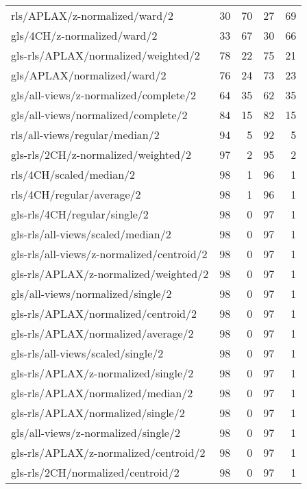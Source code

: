 \begin{longtable}{lrrrr}
    rls/APLAX/z-normalized/ward/2             & 30 & 70 & 27 & 69 \\
    gls/4CH/z-normalized/ward/2               & 33 & 67 & 30 & 66 \\
    gls-rls/APLAX/normalized/weighted/2       & 78 & 22 & 75 & 21 \\
    gls/APLAX/normalized/ward/2               & 76 & 24 & 73 & 23 \\
    gls/all-views/z-normalized/complete/2     & 64 & 35 & 62 & 35 \\
    gls/all-views/normalized/complete/2       & 84 & 15 & 82 & 15 \\
    rls/all-views/regular/median/2            & 94 &  5 & 92 &  5 \\
    gls-rls/2CH/z-normalized/weighted/2       & 97 &  2 & 95 &  2 \\
    rls/4CH/scaled/median/2                   & 98 &  1 & 96 &  1 \\
    rls/4CH/regular/average/2                 & 98 &  1 & 96 &  1 \\
    gls-rls/4CH/regular/single/2              & 98 &  0 & 97 &  1 \\
    gls-rls/all-views/scaled/median/2         & 98 &  0 & 97 &  1 \\
    gls-rls/all-views/z-normalized/centroid/2 & 98 &  0 & 97 &  1 \\
    gls-rls/APLAX/z-normalized/weighted/2     & 98 &  0 & 97 &  1 \\
    gls/all-views/normalized/single/2         & 98 &  0 & 97 &  1 \\
    gls-rls/APLAX/normalized/centroid/2       & 98 &  0 & 97 &  1 \\
    gls-rls/APLAX/normalized/average/2        & 98 &  0 & 97 &  1 \\
    gls-rls/all-views/scaled/single/2         & 98 &  0 & 97 &  1 \\
    gls-rls/APLAX/z-normalized/single/2       & 98 &  0 & 97 &  1 \\
    gls-rls/APLAX/normalized/median/2         & 98 &  0 & 97 &  1 \\
    gls-rls/APLAX/normalized/single/2         & 98 &  0 & 97 &  1 \\
    gls/all-views/z-normalized/single/2       & 98 &  0 & 97 &  1 \\
    gls-rls/APLAX/z-normalized/centroid/2     & 98 &  0 & 97 &  1 \\
    gls-rls/2CH/normalized/centroid/2         & 98 &  0 & 97 &  1 \\

\end{longtable}

